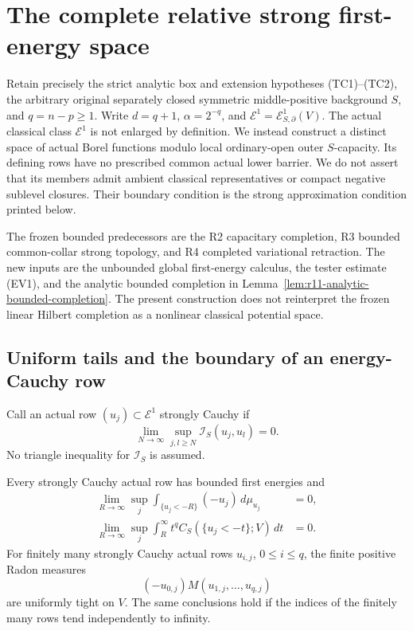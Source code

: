 \section{The complete relative strong first-energy space}
\label{sec:r11-strong-first-energy-completion}

Retain precisely the strict analytic box and extension hypotheses
(TC1)--(TC2), the arbitrary original separately closed symmetric
middle-positive background $S$, and $q=n-p\geq1$. Write
$d=q+1$, $\alpha=2^{-q}$, and $\mathcal E^1=
\mathcal E^1_{S,\partial}(V)$. The actual classical class
$\mathcal E^1$ is not enlarged by definition. We instead construct
a distinct space of actual Borel functions modulo local ordinary-open
outer $S$-capacity. Its defining rows have no prescribed common
actual lower barrier. We do not assert that its members admit
ambient classical representatives or compact negative sublevel
closures. Their boundary condition is the strong approximation
condition printed below.

The frozen bounded predecessors are the R2 capacitary completion,
R3 bounded common-collar strong topology, and R4 completed
variational retraction. The new inputs are the unbounded global
first-energy calculus, the tester estimate (EV1), and the analytic
bounded completion in Lemma~\ref{lem:r11-analytic-bounded-completion}.
The present construction does not reinterpret the frozen linear
Hilbert completion as a nonlinear classical potential space.

\subsection{Uniform tails and the boundary of an energy-Cauchy row}

Call an actual row $(u_j)\subset\mathcal E^1$ strongly Cauchy if
\[
               \lim_{N\to\infty}\sup_{j,l\geq N}
                    \mathscr I_S(u_j,u_l)=0.
 \tag{IC1}
\]
No triangle inequality for $\mathscr I_S$ is assumed.

\begin{lemma}
\label{lem:r11-strong-cauchy-uniform-tails}
Every strongly Cauchy actual row has bounded first energies and
\[
 \begin{split}
 \lim_{R\to\infty}\sup_j
     \int_{\{u_j<-R\}}(-u_j)\,d\mu_{u_j}&=0,\\
 \lim_{R\to\infty}\sup_j
     \int_R^\infty t^q C_S(\{u_j<-t\};V)\,dt&=0.
 \end{split}
 \tag{IC2}
\]
For finitely many strongly Cauchy actual rows $u_{i,j}$,
$0\leq i\leq q$, the finite positive Radon measures
\[
            (-u_{0,j})M(u_{1,j},\ldots,u_{q,j})
 \tag{IC3}
\]
are uniformly tight on $V$. The same conclusions hold if the
indices of the finitely many rows tend independently to infinity.
\end{lemma}

